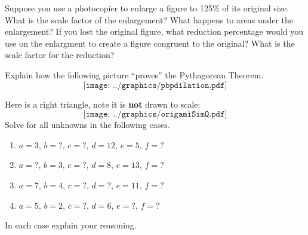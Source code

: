 
\begin{prob}
Suppose you use a photocopier to enlarge a figure to 125\% of its original size.  What is the scale factor of the enlargement?  What happens to areas under the enlargement?  If you lost the original figure, what reduction percentage would you use on the enlargment to create a figure congruent to the original?  What is the scale factor for the reduction?  
\end{prob}

\begin{prob}
Explain how the following picture ``proves'' the Pythagorean Theorem.
\[
\texttt{[image: ../graphics/pbpdilation.pdf]}
\]
\end{prob}

\begin{prob}
Here is a right triangle, note it is \textbf{not} drawn to scale:
\[
\texttt{[image: ../graphics/origamiSimQ.pdf]}
\]
Solve for all unknowns in the following cases.
\begin{enumerate}
\item $a = 3$, $b = ?$, $c = ?$, $d = 12$, $e = 5$, $f = ?$
\item $a = ?$, $b = 3$, $c = ?$, $d =8$, $e = 13$, $f = ?$
\item $a = 7$, $b = 4$, $c = ?$, $d =?$, $e = 11$, $f = ?$
\item $a = 5$, $b = 2$, $c = ?$, $d =6$, $e = ?$, $f = ?$
\end{enumerate}
In each case explain your reasoning.
\end{prob}

